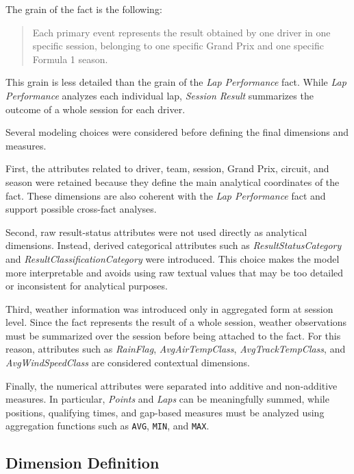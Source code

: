 \documentclass[a4paper,11pt]{article}
\begin{document}
	The grain of the fact is the following:
	
	\begin{quote}
		Each primary event represents the result obtained by one driver in one specific
		session, belonging to one specific Grand Prix and one specific Formula 1 season.
	\end{quote}
	
	This grain is less detailed than the grain of the \textit{Lap Performance} fact. While
	\textit{Lap Performance} analyzes each individual lap, \textit{Session Result} summarizes
	the outcome of a whole session for each driver.
	
	Several modeling choices were considered before defining the final dimensions and
	measures.
	
	First, the attributes related to driver, team, session, Grand Prix, circuit, and season
	were retained because they define the main analytical coordinates of the fact. These
	dimensions are also coherent with the \textit{Lap Performance} fact and support possible
	cross-fact analyses.
	
	Second, raw result-status attributes were not used directly as analytical dimensions.
	Instead, derived categorical attributes such as \textit{ResultStatusCategory} and
	\textit{ResultClassificationCategory} were introduced. This choice makes the model more
	interpretable and avoids using raw textual values that may be too detailed or inconsistent
	for analytical purposes.
	
	Third, weather information was introduced only in aggregated form at session level.
	Since the fact represents the result of a whole session, weather observations must be
	summarized over the session before being attached to the fact. For this reason, attributes
	such as \textit{RainFlag}, \textit{AvgAirTempClass}, \textit{AvgTrackTempClass}, and
	\textit{AvgWindSpeedClass} are considered contextual dimensions.
	
	Finally, the numerical attributes were separated into additive and non-additive
	measures. In particular, \textit{Points} and \textit{Laps} can be meaningfully summed,
	while positions, qualifying times, and gap-based measures must be analyzed using
	aggregation functions such as \texttt{AVG}, \texttt{MIN}, and \texttt{MAX}.
	
	\subsection{Dimension Definition}
	
\end{document}
